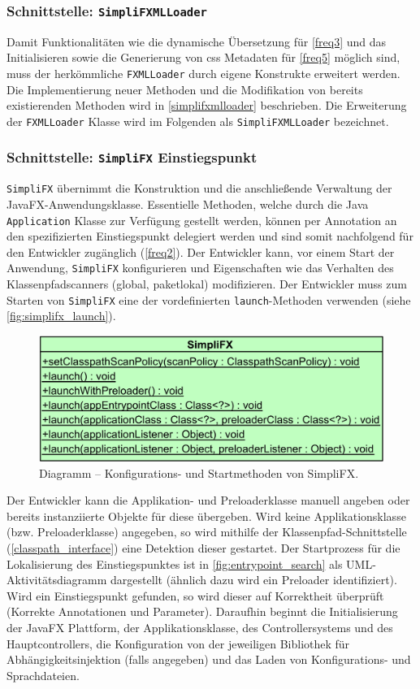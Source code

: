 \subsubsection{Schnittstelle: \texttt{SimpliFXMLLoader}}
Damit Funktionalitäten wie die dynamische Übersetzung für \autoref{freq3} und das Initialisieren sowie die Generierung von \ac{css} Metadaten für \autoref{freq5} möglich sind, muss der herkömmliche \texttt{FXMLLoader} durch eigene Konstrukte erweitert werden. Die Implementierung neuer Methoden und die Modifikation von bereits existierenden Methoden wird in \autoref{simplifxmlloader} beschrieben. Die Erweiterung der \texttt{FXMLLoader} Klasse wird im Folgenden als \texttt{SimpliFXMLLoader} bezeichnet.
\subsubsection{Schnittstelle: \texttt{SimpliFX} Einstiegspunkt}
\texttt{SimpliFX} übernimmt die Konstruktion und die anschließende Verwaltung der JavaFX-Anwendungsklasse. Essentielle Methoden, welche durch die Java \texttt{Application} Klasse zur Verfügung gestellt werden, können per Annotation an den spezifizierten Einstiegspunkt delegiert werden und sind somit nachfolgend für den Entwickler zugänglich (\autoref{freq2}). Der Entwickler kann, vor einem Start der Anwendung, \texttt{SimpliFX} konfigurieren und Eigenschaften wie das Verhalten des Klassenpfadscanners (global, paketlokal) modifizieren. Der Entwickler muss zum Starten von \texttt{SimpliFX} eine der vordefinierten \texttt{launch}-Methoden verwenden (siehe \autoref{fig:simplifx_launch}). 
\begin{figure}[H]
	\centering
	\includegraphics[width=\textwidth-2cm]{Abbildungen/SimpliFX Einstiegspunkt.png}
	\caption{Diagramm -- Konfigurations- und Startmethoden von SimpliFX.}
	\label{fig:simplifx_launch}
\end{figure}
\noindent Der Entwickler kann die Applikation- und Preloaderklasse manuell angeben oder bereits instanziierte Objekte für diese übergeben. Wird keine Applikationsklasse (bzw. Preloaderklasse) angegeben, so wird mithilfe der Klassenpfad-Schnittstelle (\autoref{classpath_interface}) eine Detektion dieser gestartet. Der Startprozess für die Lokalisierung des Einstiegspunktes ist in \autoref{fig:entrypoint_search} als UML-Aktivitätsdiagramm dargestellt (ähnlich dazu wird ein Preloader identifiziert). Wird ein Einstiegspunkt gefunden, so wird dieser auf Korrektheit überprüft (Korrekte Annotationen und Parameter). Daraufhin beginnt die Initialisierung der JavaFX Plattform, der Applikationsklasse, des Controllersystems und des Hauptcontrollers, die Konfiguration von der jeweiligen Bibliothek für Abhängigkeitsinjektion (falls angegeben) und das Laden von Konfigurations- und Sprachdateien.
